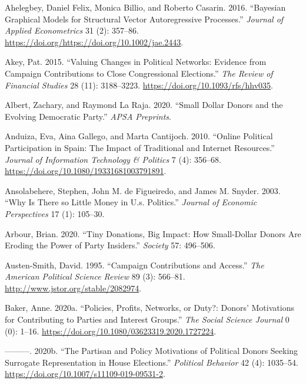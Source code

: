 \documentclass[12pt,]{article}
\begin{document}
\hypertarget{refs}{}
\leavevmode\hypertarget{ref-bic}{}%
Ahelegbey, Daniel Felix, Monica Billio, and Roberto Casarin. 2016.
``Bayesian Graphical Models for Structural Vector Autoregressive
Processes.'' \emph{Journal of Applied Econometrics} 31 (2): 357--86.
\url{https://doi.org/https://doi.org/10.1002/jae.2443}.

\leavevmode\hypertarget{ref-akey2015}{}%
Akey, Pat. 2015. ``Valuing Changes in Political Networks: Evidence from
Campaign Contributions to Close Congressional Elections.'' \emph{The
Review of Financial Studies} 28 (11): 3188--3223.
\url{https://doi.org/10.1093/rfs/hhv035}.

\leavevmode\hypertarget{ref-albert2020}{}%
Albert, Zachary, and Raymond La Raja. 2020. ``Small Dollar Donors and
the Evolving Democratic Party.'' \emph{APSA Preprints}.

\leavevmode\hypertarget{ref-anduiza2010}{}%
Anduiza, Eva, Aina Gallego, and Marta Cantijoch. 2010. ``Online
Political Participation in Spain: The Impact of Traditional and Internet
Resources.'' \emph{Journal of Information Technology \& Politics} 7 (4):
356--68. \url{https://doi.org/10.1080/19331681003791891}.

\leavevmode\hypertarget{ref-ansolabehere2003}{}%
Ansolabehere, Stephen, John M. de Figueiredo, and James M. Snyder. 2003.
``Why Is There so Little Money in U.s. Politics.'' \emph{Journal of
Economic Perspectives} 17 (1): 105--30.

\leavevmode\hypertarget{ref-arbour2020}{}%
Arbour, Brian. 2020. ``Tiny Donations, Big Impact: How Small-Dollar
Donors Are Eroding the Power of Party Insiders.'' \emph{Society} 57:
496--506.

\leavevmode\hypertarget{ref-austensmith1995}{}%
Austen-Smith, David. 1995. ``Campaign Contributions and Access.''
\emph{The American Political Science Review} 89 (3): 566--81.
\url{http://www.jstor.org/stable/2082974}.

\leavevmode\hypertarget{ref-baker2020a}{}%
Baker, Anne. 2020a. ``Policies, Profits, Networks, or Duty?: Donors'
Motivations for Contributing to Parties and Interest Groups.'' \emph{The
Social Science Journal} 0 (0): 1--16.
\url{https://doi.org/10.1080/03623319.2020.1727224}.

\leavevmode\hypertarget{ref-baker2020b}{}%
---------. 2020b. ``The Partisan and Policy Motivations of Political
Donors Seeking Surrogate Representation in House Elections.''
\emph{Political Behavior} 42 (4): 1035--54.
\url{https://doi.org/10.1007/s11109-019-09531-2}.
\end{document}
